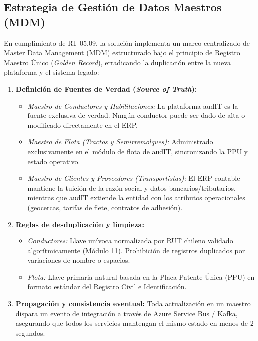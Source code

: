 \subsection{Estrategia de Gestión de Datos Maestros (MDM)}

En cumplimiento de RT-05.09, la solución implementa un marco centralizado de Master Data Management (MDM) estructurado bajo el principio de Registro Maestro Único (\textit{Golden Record}), erradicando la duplicación entre la nueva plataforma y el sistema legado:

\begin{enumerate}
    \item \textbf{Definición de Fuentes de Verdad (\textit{Source of Truth}):}
    \begin{itemize}
        \item \textit{Maestro de Conductores y Habilitaciones:} La plataforma audIT es la fuente exclusiva de verdad. Ningún conductor puede ser dado de alta o modificado directamente en el ERP.
        \item \textit{Maestro de Flota (Tractos y Semirremolques):} Administrado exclusivamente en el módulo de flota de audIT, sincronizando la PPU y estado operativo.
        \item \textit{Maestro de Clientes y Proveedores (Transportistas):} El ERP contable mantiene la tuición de la razón social y datos bancarios/tributarios, mientras que audIT extiende la entidad con los atributos operacionales (geocercas, tarifas de flete, contratos de adhesión).
    \end{itemize}
    \item \textbf{Reglas de desduplicación y limpieza:}
    \begin{itemize}
        \item \textit{Conductores:} Llave unívoca normalizada por RUT chileno validado algorítmicamente (Módulo 11). Prohibición de registros duplicados por variaciones de nombre o espacios.
        \item \textit{Flota:} Llave primaria natural basada en la Placa Patente Única (PPU) en formato estándar del Registro Civil e Identificación.
    \end{itemize}
    \item \textbf{Propagación y consistencia eventual:} Toda actualización en un maestro dispara un evento de integración a través de Azure Service Bus / Kafka, asegurando que todos los servicios mantengan el mismo estado en menos de 2 segundos.
\end{enumerate}

